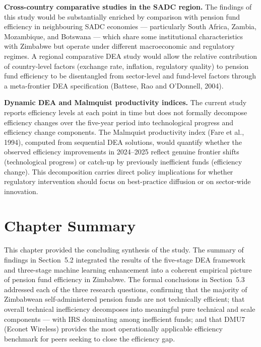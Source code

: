 \documentclass[12pt,a4paper]{article}
\begin{document}
\textbf{Cross-country comparative studies in the SADC region.} The findings of this study would be substantially enriched by comparison with pension fund efficiency in neighbouring SADC economies --- particularly South Africa, Zambia, Mozambique, and Botswana --- which share some institutional characteristics with Zimbabwe but operate under different macroeconomic and regulatory regimes. A regional comparative DEA study would allow the relative contribution of country-level factors (exchange rate, inflation, regulatory quality) to pension fund efficiency to be disentangled from sector-level and fund-level factors through a meta-frontier DEA specification (Battese, Rao and O'Donnell, 2004).

\textbf{Dynamic DEA and Malmquist productivity indices.} The current study reports efficiency levels at each point in time but does not formally decompose efficiency changes over the five-year period into technological progress and efficiency change components. The Malmquist productivity index (Fare et al., 1994), computed from sequential DEA solutions, would quantify whether the observed efficiency improvements in 2024--2025 reflect genuine frontier shifts (technological progress) or catch-up by previously inefficient funds (efficiency change). This decomposition carries direct policy implications for whether regulatory intervention should focus on best-practice diffusion or on sector-wide innovation.

\section{Chapter Summary}

This chapter provided the concluding synthesis of the study. The summary of findings in Section~5.2 integrated the results of the five-stage DEA framework and three-stage machine learning enhancement into a coherent empirical picture of pension fund efficiency in Zimbabwe. The formal conclusions in Section~5.3 addressed each of the three research questions, confirming that the majority of Zimbabwean self-administered pension funds are not technically efficient; that overall technical inefficiency decomposes into meaningful pure technical and scale components --- with IRS dominating among inefficient funds; and that DMU7 (Econet Wireless) provides the most operationally applicable efficiency benchmark for peers seeking to close the efficiency gap.
\end{document}
